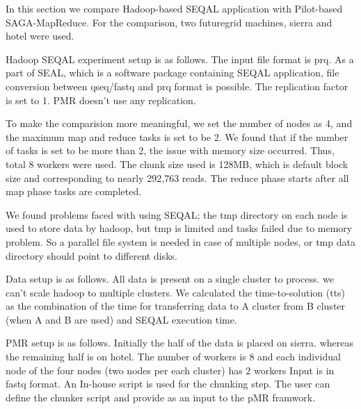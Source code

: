 \documentclass{sig-alternate}
\begin{document}

In this section we compare Hadoop-based SEQAL application with Pilot-based SAGA-MapReduce. 
For the comparison, two futuregrid machines, sierra and hotel were used.

Hadoop SEQAL experiment setup is as follows.  The input file format is prq.  As a part of SEAL, which is a software package containing SEQAL application, file conversion between qseq/fastq and prq format is possible.  The replication factor is set  to 1.     PMR doesn't use any replication.

To make the comparision more meaningful, we set the number of nodes as 4, and the maximum map and reduce tasks is set to be 2.  We found that if the number of tasks is set to be more than 2, the issue with memory size occurred.    Thus, total 8 workers were used.
The chunk size used is 128MB, which is default block size and corresponding to nearly 292,763 reads.
The reduce phase starts after all map phase tasks are completed. 

We found problems faced with using SEQAL; the tmp directory on each node is used to store data  by hadoop, but tmp is limited and tasks failed due to memory problem.  So a parallel file system is needed in case of multiple nodes, or tmp data directory should point to different disks.

Data setup is as follows. All data is present on a single cluster to process. we can't scale hadoop to multiple clusters.
We calculated the time-to-solution (tts) as the combination of the time for transferring data to A cluster from B cluster (when A and B are used) and SEQAL execution time. 
 
PMR setup is as follows.  Initially the half of the data is placed on sierra. whereas the remaining half is on hotel. The number of workers is 8 and each individual node of the four nodes (two nodes per each cluster) has 2 workers
   Input is in fastq format. An In-house script is used for the chunking step. The user can define the chunker script and provide as an input to the pMR framwork.  
 
\end{document}

